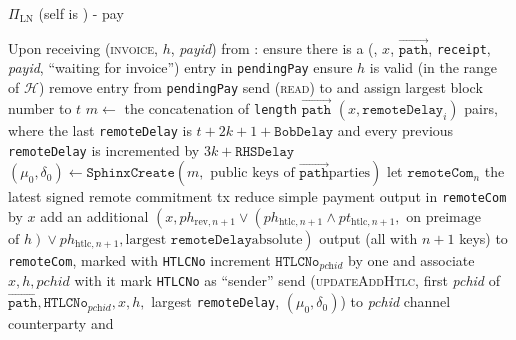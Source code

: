 \begin{protocolbox}{$\Pi_{\mathrm{LN}}$ (self is \alice) - pay}
\begin{algorithmic}[1]
    \State Upon receiving (\textsc{invoice}, $h$, \textit{payid}) from \bob:
    \Indent
      \State ensure there is a (\bob, $x$, $\overrightarrow{\mathtt{path}}$,
      \texttt{receipt}, \textit{payid}, ``waiting for invoice'') entry in
      \texttt{pendingPay}
      \State ensure $h$ is valid (in the range of $\mathcal{H}$)
      \State remove entry from \texttt{pendingPay}
      \State send (\textsc{read}) to \ledger{} and assign largest block number
      to $t$
      \State $m \gets$ the concatenation of \texttt{length}
      $\overrightarrow{\mathtt{path}}$ $\left(x, \mathtt{remoteDelay}_i\right)$
      pairs, where the last \texttt{remoteDelay} is $t + 2k + 1 +
      \mathtt{BobDelay}$ and every previous \texttt{remoteDelay} is incremented
      by $3k + \mathtt{RHSDelay}$ 
      \State $\left(\mu_0, \delta_0\right) \gets \mathtt{SphinxCreate}\left(m,
      \text{ public keys of } \overrightarrow{\mathtt{path}} \text{
      parties}\right)$
      \State let $\mathtt{remoteCom}_n$ the latest signed remote commitment tx
      \State reduce simple payment output in \texttt{remoteCom} by $x$
      \State add an additional $\left(x, ph_{\mathrm{rev}, n+1} \vee
      \left(ph_{\mathrm{htlc}, n+1} \wedge pt_{\mathrm{htlc}, n+1}, \text{ on
      preimage}\right.\right.$ $\left.\left.\text{of } h\right) \vee
      ph_{\mathrm{htlc}, n+1}, \text{largest } \mathtt{remoteDelay} \text{
      absolute}\right)$ output (all with $n+1$ keys) to \texttt{remoteCom},
      marked with \texttt{HTLCNo}
      \State increment $\mathtt{HTLCNo}_{\textit{pchid}}$ by one and associate
      $x, h, \mathit{pchid}$ with it
      \State mark \texttt{HTLCNo} as ``sender''
      \State send (\textsc{updateAddHtlc}, first \textit{pchid} of
      $\overrightarrow{\mathtt{path}}, \mathtt{HTLCNo}_{\textit{pchid}}, x, h,$
      largest \texttt{remoteDelay}, $\left(\mu_0, \delta_0\right)$) to
      \textit{pchid} channel counterparty and \adversary
    \EndIndent
    \State


\end{algorithmic}
\end{protocolbox}
